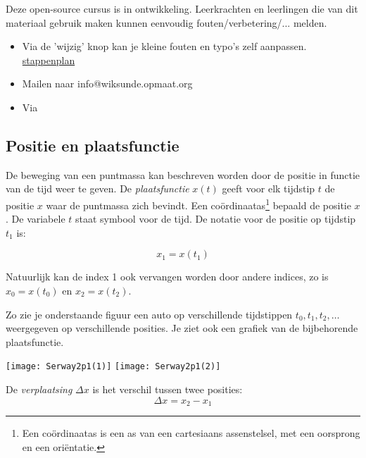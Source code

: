 \documentclass{ximera}
\begin{document}
	\author{Bart Lambregs}
    \xmsource


\begin{remark}
	Deze open-source cursus is in ontwikkeling. Leerkrachten en leerlingen die van dit materiaal gebruik maken kunnen eenvoudig fouten/verbetering/... melden. 

	\begin{itemize}
		\item Via de 'wijzig' knop kan je kleine fouten en typo's zelf aanpassen. \href{https://wiskunde.opmaat.org/website/inhoud/welkom/doe-mee}{stappenplan}
		\item Mailen naar info@wiksunde.opmaat.org 
		\item Via 
	\end{itemize}
\end{remark}


\subsection{Positie en plaatsfunctie}

De beweging van een puntmassa kan beschreven worden door de positie in functie van de tijd weer te geven. De \emph{plaatsfunctie} $x(t)$ geeft voor elk tijdstip \(t\) de positie \(x\) waar de puntmassa zich bevindt. Een coördinaatas\footnote{Een coördinaatas is een as van een cartesiaans assenstelsel, met een oorsprong en een oriëntatie.} bepaald de positie \(x\). De variabele \(t\) staat symbool voor de tijd. De notatie voor de positie op tijdstip $t_1$ is: 

\[
x_1=x(t_1)
\]

Natuurlijk kan de index 1 ook vervangen worden door andere indices, zo is $x_0=x(t_0)$ en $x_2=x(t_2)$.

Zo zie je onderstaande figuur een auto op verschillende tijdstippen $t_0,t_1, t_2,\ldots$ weer\-ge\-ge\-ven op verschillende posities. Je ziet ook een grafiek van de bijbehorende plaatsfunctie.

\begin{image}
\hfill
\texttt{[image: Serway2p1(1)]}
\hfill
\texttt{[image: Serway2p1(2)]}
\hfill

\end{image}


\begin{definition}
De \emph{verplaatsing} \(\Delta x\) is het verschil tussen twee posities:
\[
\Delta x = x_2-x_1
\]
\end{definition}
\end{document}
